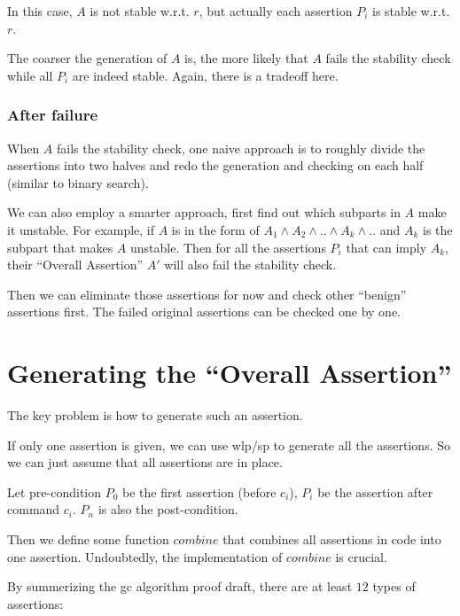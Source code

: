 \documentclass[12pt, fleqn]{article}
\begin{document}
In this case, $A$ is not stable w.r.t. $r$, but actually each assertion
$P_i$ is stable w.r.t. $r$.

The coarser the generation of $A$ is, the more likely that $A$ fails
the stability check while all $P_i$ are indeed stable. Again, there is
a tradeoff here.


\subsubsection{After failure}

When $A$ fails the stability check, one naive approach is to roughly
divide the assertions into two halves and redo the generation and
checking on each half (similar to binary search).

We can also employ a smarter approach, first find out which subparts
in $A$ make it unstable. For example, if $A$ is in the form of $A_1
\land A_2 \land .. \land A_k \land ..$ and $A_k$ is the subpart that
makes $A$ unstable. Then for all the assertions $P_i$ that can imply
$A_k$, their ``Overall Assertion'' $A'$ will also fail the stability
check.

Then we can eliminate those assertions for now and check other
``benign'' assertions first. The failed original assertions can be
checked one by one.


\section{Generating the ``Overall Assertion''}

The key problem is how to generate such an assertion.

\bigskip

If only one assertion is given, we can use wlp/sp to generate all the
assertions. So we can just assume that all assertions are in place.

Let pre-condition $P_0$ be the first assertion (before $c_i$), $P_i$
be the assertion after command $c_i$. $P_n$ is also the
post-condition.

Then we define some function $combine$ that combines all assertions in
code into one assertion. Undoubtedly, the implementation of $combine$
is crucial.

\bigskip

By summerizing the gc algorithm proof draft, there are at least $12$
types of assertions:
\end{document}
